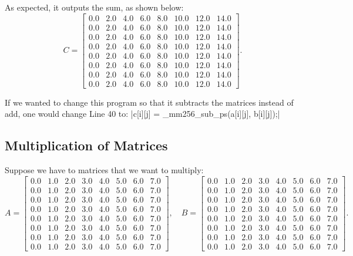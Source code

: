 \documentclass[10pt]{article}
\theoremstyle{definition}
\theoremstyle{plain}
\begin{document}
As expected, it outputs the sum, as shown below:
\[
C =
\begin{bmatrix}
    0.0 & 2.0 & 4.0 & 6.0 & 8.0 & 10.0 & 12.0 & 14.0 \\
    0.0 & 2.0 & 4.0 & 6.0 & 8.0 & 10.0 & 12.0 & 14.0 \\
    0.0 & 2.0 & 4.0 & 6.0 & 8.0 & 10.0 & 12.0 & 14.0 \\
    0.0 & 2.0 & 4.0 & 6.0 & 8.0 & 10.0 & 12.0 & 14.0 \\
    0.0 & 2.0 & 4.0 & 6.0 & 8.0 & 10.0 & 12.0 & 14.0 \\
    0.0 & 2.0 & 4.0 & 6.0 & 8.0 & 10.0 & 12.0 & 14.0 \\
    0.0 & 2.0 & 4.0 & 6.0 & 8.0 & 10.0 & 12.0 & 14.0 \\
    0.0 & 2.0 & 4.0 & 6.0 & 8.0 & 10.0 & 12.0 & 14.0
\end{bmatrix}.
\]

If we wanted to change this program so that it subtracts the matrices instead of add, one would change Line 40 to:
|c[i][j] = _mm256_sub_ps(a[i][j], b[i][j]);|

\subsection{Multiplication of Matrices}
Suppose we have to matrices that we want to multiply:
\[
A =
\begin{bmatrix}
    0.0 & 1.0 & 2.0 & 3.0 & 4.0 & 5.0 & 6.0 & 7.0 \\
    0.0 & 1.0 & 2.0 & 3.0 & 4.0 & 5.0 & 6.0 & 7.0 \\
    0.0 & 1.0 & 2.0 & 3.0 & 4.0 & 5.0 & 6.0 & 7.0 \\
    0.0 & 1.0 & 2.0 & 3.0 & 4.0 & 5.0 & 6.0 & 7.0 \\
    0.0 & 1.0 & 2.0 & 3.0 & 4.0 & 5.0 & 6.0 & 7.0 \\
    0.0 & 1.0 & 2.0 & 3.0 & 4.0 & 5.0 & 6.0 & 7.0 \\
    0.0 & 1.0 & 2.0 & 3.0 & 4.0 & 5.0 & 6.0 & 7.0 \\
    0.0 & 1.0 & 2.0 & 3.0 & 4.0 & 5.0 & 6.0 & 7.0
\end{bmatrix}, \quad
B =
\begin{bmatrix}
    0.0 & 1.0 & 2.0 & 3.0 & 4.0 & 5.0 & 6.0 & 7.0 \\
    0.0 & 1.0 & 2.0 & 3.0 & 4.0 & 5.0 & 6.0 & 7.0 \\
    0.0 & 1.0 & 2.0 & 3.0 & 4.0 & 5.0 & 6.0 & 7.0 \\
    0.0 & 1.0 & 2.0 & 3.0 & 4.0 & 5.0 & 6.0 & 7.0 \\
    0.0 & 1.0 & 2.0 & 3.0 & 4.0 & 5.0 & 6.0 & 7.0 \\
    0.0 & 1.0 & 2.0 & 3.0 & 4.0 & 5.0 & 6.0 & 7.0 \\
    0.0 & 1.0 & 2.0 & 3.0 & 4.0 & 5.0 & 6.0 & 7.0 \\
    0.0 & 1.0 & 2.0 & 3.0 & 4.0 & 5.0 & 6.0 & 7.0
\end{bmatrix}.
\]
\end{document}
